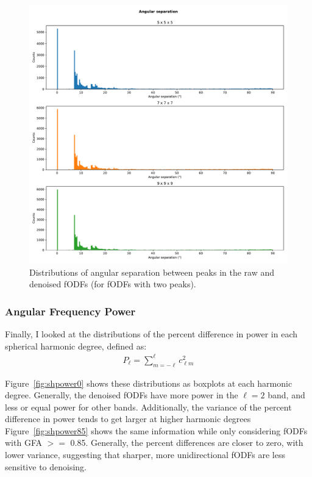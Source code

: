\documentclass{article}
\begin{document}
\begin{figure}[H]
  \centering
  \includegraphics[width=0.6\linewidth]{../figs/angdifference_firsttwo}
  \captionsetup{width=0.6\linewidth}
  \caption{Distributions of angular separation between peaks in the raw and
    denoised fODFs (for fODFs with two peaks).}
  \label{fig:angdiff}
\end{figure}

\subsubsection{Angular Frequency Power}

Finally, I looked at the distributions of the percent difference in power in
each spherical harmonic degree, defined as:
\begin{align}
  P_{\ell} = \sum_{m=-\ell}^{\ell} c_{\ell m}^2
\end{align}

Figure~\ref{fig:shpower0} shows these distributions as boxplots at each harmonic
degree. Generally, the denoised fODFs have more power in the $\ell = 2$ band,
and less or equal power for other bands. Additionally, the variance of the
percent difference in power tends to get larger at higher harmonic degrees
Figure~\ref{fig:shpower85} shows the same information while only considering
fODFs with GFA $>=$ 0.85. Generally, the percent differences are closer to zero,
with lower variance, suggesting that sharper, more unidirectional fODFs are less
sensitive to denoising.
\end{document}
